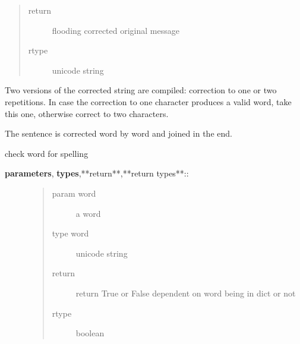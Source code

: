 \documentclass[letterpaper,10pt,english]{sphinxmanual}
\begin{document}
\begin{fulllineitems}
\begin{fulllineitems}
\begin{description}
\begin{quote}
\begin{description}
\item[{return}] \leavevmode
flooding corrected original message

\item[{rtype}] \leavevmode
unicode string

\end{description}\end{quote}

\end{description}

Two versions of the corrected string are compiled: correction to one or two repetitions. In case
the correction to one character produces a valid word, take this one, otherwise correct to two characters.

The sentence is corrected word by word and joined in the end.

\end{fulllineitems}


\begin{fulllineitems}
\label{API:norm.modules.flooding.Flooding.hunspell_check}
check word for spelling
\begin{description}
\item[{\textbf{parameters}, \textbf{types},**return**,**return types**::}] \leavevmode\begin{quote}\begin{description}
\item[{param word}] \leavevmode
a word

\item[{type word}] \leavevmode
unicode string

\item[{return}] \leavevmode
return True or False dependent on word being in dict or not

\item[{rtype}] \leavevmode
boolean

\end{description}\end{quote}

\end{description}

\end{fulllineitems}


\end{fulllineitems}
\end{document}
